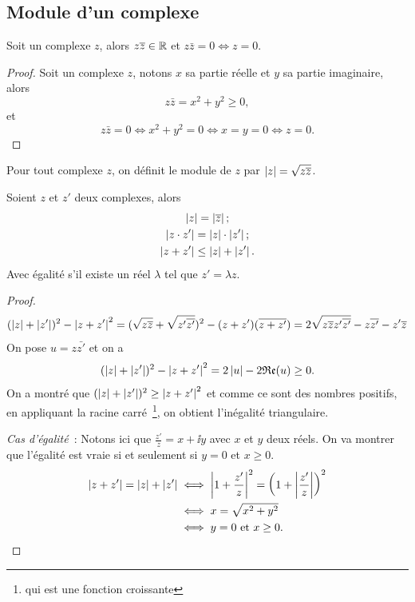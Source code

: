 \subsection{Module d'un complexe}
\label{subsec:modulecomplexe}
\begin{prop}
  Soit un complexe $z$, alors $z \overline{z} \in \mathbb{R}$ et $z \bar{z}=0 \iff z = 0$.
\end{prop}
\begin{proof}
  Soit un complexe $z$, notons $x$ sa partie réelle et $y$ sa partie imaginaire, alors 
  \begin{equation}
    z \bar{z}=x^2+y^2 \geq 0,
  \end{equation}
  et 
  \begin{equation}
    z \bar{z}=0 \iff x^2+y^2=0 \iff x=y=0 \iff z=0.
  \end{equation}
\end{proof}
%
\begin{defdef}
  Pour tout complexe $z$, on définit le module de $z$ par $\left\lvert z\right\rvert=\sqrt{z \overline{z}}$.
\end{defdef}
%
\begin{prop}
  Soient $z$ et $z'$ deux complexes, alors
  \begin{gather}
    \left\lvert z\right\rvert=\left\lvert\overline{z}\right\rvert; \\ 
    \left\lvert z \cdot z'\right\rvert=\left\lvert z\right\rvert \cdot \left\lvert z'\right\rvert; \\ 
    \left\lvert z+z'\right\rvert\leq\left\lvert z\right\rvert+\left\lvert z'\right\rvert.
  \end{gather}
  Avec égalité s'il existe un réel $\lambda$ tel que $z'=\lambda z$.
\end{prop}
\begin{proof}
  \begin{equation}
    (\left\lvert z\right\rvert+\left\lvert z'\right\rvert)^2-\left\lvert z+z'\right\rvert^2
    =(\sqrt{z \overline{z}} +\sqrt{z' \overline{z'}})^2 - (z+z')(\overline{z+z'})
    =2 \sqrt{z \overline{z} z' \overline{z'}} - z \overline{z'} - z'\overline{z} 
  \end{equation}
  On pose $u=z \bar{z'}$ et on a 
  \begin{equation}
    (\left\lvert z\right\rvert+\left\lvert z'\right\rvert)^2-\left\lvert z+z'\right\rvert^2=2 \left\lvert u\right\rvert-2 \mathfrak{Re}(u) \geq 0.
  \end{equation}
  On a montré que $(\left\lvert z\right\rvert+\left\lvert z'\right\rvert)^2 \geq \left\lvert z+z'\right\rvert^2$ et comme ce sont des nombres positifs, en appliquant la racine carré~\footnote{qui est une fonction croissante}, on obtient l'inégalité triangulaire.

  \emph{Cas d'égalité}~: Notons ici que $\frac{z'}{z}=x + \ii y$ avec $x$ et $y$ deux réels. On va montrer que l'égalité est vraie si et seulement si $y=0$ et $x \geq 0$.
  \begin{align}
    \left\lvert z+z'\right\rvert=\left\lvert z\right\rvert+\left\lvert z'\right\rvert &\iff \left\lvert1+\frac{z'}{z}\right\rvert^2=\left(1+\left\lvert\frac{z'}{z}\right\rvert\right)^2 \\ 
    &\iff x = \sqrt{x^2+y^2}\\ 
    &\iff y=0 \text{~et~} x \geq 0.
  \end{align}
\end{proof}
